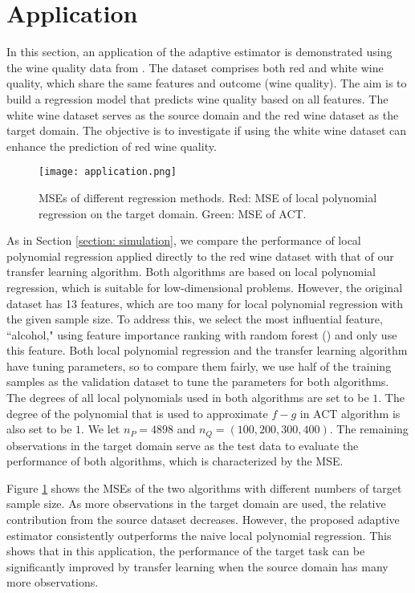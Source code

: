 \documentclass{article}
\begin{document}
\section{Application}
\label{section: application}
In this section, an application of the adaptive estimator is demonstrated using the wine quality data from \cite{cortez2009modeling}. The dataset comprises both red and white wine quality, which share the same features and outcome (wine quality). The aim is to build a regression model that predicts wine quality based on all features. The white wine dataset serves as the source domain and the red wine dataset as the target domain. The objective is to investigate if using the white wine dataset can enhance the prediction of red wine quality.


\begin{figure}[h]
    \texttt{[image: application.png]}
    \caption{MSEs of different regression methods. Red: MSE of local polynomial regression on the target domain. Green: MSE of ACT.}\label{fig:application}
  \end{figure}

As in Section \ref{section: simulation},  we compare the performance of local polynomial regression applied directly to the red wine dataset with that of our transfer learning algorithm. Both algorithms are based on local polynomial regression, which is suitable for low-dimensional problems. However, the original dataset has 13 features, which are too many for local polynomial regression with the given sample size. To address this, we select the most influential feature, ``alcohol," using feature importance ranking with random forest (\citealp{breiman2001random}) and only use this feature. Both local polynomial regression and the transfer learning algorithm have tuning parameters, so to compare them fairly, we use half of the training samples as the validation dataset to tune the parameters for both algorithms. The degrees of all local polynomials used in both algorithms are set to be $1$. The degree of the polynomial that is used to approximate $f-g$ in ACT algorithm is also set to be $1$.
We let $n_P=4898$ and $n_Q=(100,200,300,400)$. The remaining observations in the target domain serve as the test data to evaluate the performance of both algorithms, which is characterized by the MSE.

Figure \ref{fig:application} shows the MSEs of the two algorithms with different numbers of target sample size. As more observations in the target domain are used, the relative contribution from the source dataset decreases. However, the proposed adaptive estimator consistently outperforms the naive local polynomial regression. This shows that in this application, the performance of the target task can be significantly improved by transfer learning when the source domain has many more observations.
\end{document}
